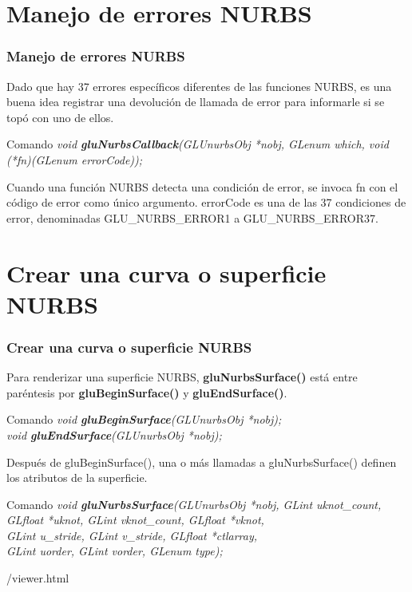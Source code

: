 \documentclass[10.5pt]{beamer}
\begin{document}

\section{Manejo de errores NURBS}
\begin{frame}[fragile]
\frametitle{Manejo de errores NURBS}
\small
Dado que hay 37 errores específicos diferentes de las funciones NURBS,
es una buena idea registrar una devolución de llamada de error para
informarle si se topó con uno de ellos.

\begin{alertblock}{Comando}
    \small
    \emph{void \textbf{gluNurbsCallback}(GLUnurbsObj *nobj, GLenum which,
void (*fn)(GLenum errorCode));}
\end{alertblock}

Cuando una función NURBS detecta una condición de error, se invoca fn con el código de error como único argumento. errorCode es una de las 37 condiciones de error, denominadas GLU\_NURBS\_ERROR1 a GLU\_NURBS\_ERROR37.

\end{frame}


\section{Crear una curva o superficie NURBS}
\begin{frame}[fragile]
\frametitle{Crear una curva o superficie NURBS}
\small
Para renderizar una superficie NURBS, \textbf{gluNurbsSurface()}
está entre paréntesis por \textbf{gluBeginSurface()} y
\textbf{gluEndSurface()}.

\begin{alertblock}{Comando}
    \small
    \emph{void \textbf{gluBeginSurface}(GLUnurbsObj *nobj);}\\
    \emph{void \textbf{gluEndSurface}(GLUnurbsObj *nobj);}
\end{alertblock}

Después de gluBeginSurface(), una o más
llamadas a gluNurbsSurface() definen los atributos de
la superficie.

\begin{alertblock}{Comando}
    \small
    \emph{void \textbf{gluNurbsSurface}(GLUnurbsObj *nobj, GLint uknot\_count,\\
    GLfloat *uknot, GLint vknot\_count, GLfloat *vknot,\\
    GLint u\_stride, GLint v\_stride, GLfloat *ctlarray,\\
    GLint uorder, GLint vorder, GLenum type);}
\end{alertblock}

\end{frame}
/viewer.html
\end{document}
